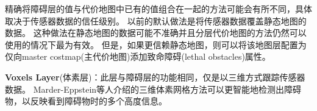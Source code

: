 精确将障碍层的值与代价地图中已有的值组合在一起的方法可能会有所不同，具体取决于传感器数据的信任级别。 
以前的默认做法是将传感器数据覆盖静态地图的数据。 
这种做法在静态地图的数据可能不准确并且分层代价地图的方法仍然可以使用的情况下最为有效。 
但是，如果更信赖静态地图，则可以将该地图层配置为仅向master costmap(主代价地图)添加致命障碍(lethal obstacles)属性。


\textbf{\color{blue}Voxels Layer}(体素层)：此层与障碍层的功能相同，仅是以三维方式跟踪传感器数据。 Marder-Eppstein等人介绍的三维体素网格方法\cite{marder2010office}可以更智能地检测出障碍物，以反映看到障碍物时的多个高度信息。

